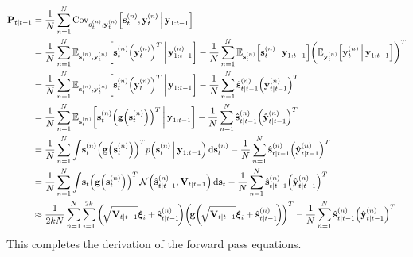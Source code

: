 		\begin{align}
			\mat{P}_{t \subgiven t - 1}
				&= \frac{1}{N} \sum_{n = 1}^{N} \Cov_{\vec{s}_t^{(n)}, \vec{y}_t^{(n)}}\!\Big[\vec{s}_t^{(n)}, \vec{y}_t^{(n)} \Biggiven \vec{y}_{1:t - 1}\Big]  \nonumber \\
				&= \frac{1}{N} \sum_{n = 1}^{N} \E_{\vec{s}_t^{(n)}, \vec{y}_t^{(n)}}\bigg[\vec{s}_t^{(n)} \Big(\vec{y}_t^{(n)}\Big)^T \bigggiven \vec{y}_{1:t - 1}^{(n)}\bigg] - \frac{1}{N} \sum_{n = 1}^{N} \E_{\vec{s}_t^{(n)}}\Big[\vec{s}_t^{(n)} \Biggiven \vec{y}_{1:t - 1}\Big] \bigg(\E_{\vec{y}_t^{(n)}}\Big[\vec{y}_t^{(n)} \Biggiven \vec{y}_{1:t - 1}\Big]\bigg)^T  \nonumber \\
				&= \frac{1}{N} \sum_{n = 1}^{N} \E_{\vec{s}_t^{(n)}, \vec{y}_t^{(n)}}\bigg[\vec{s}_t^{(n)} \Big(\vec{y}_t^{(n)}\Big)^T \bigggiven \vec{y}_{1:t - 1}\bigg] - \frac{1}{N} \sum_{n = 1}^{N} \hat{\vec{s}}_{t \subgiven t - 1}^{(n)} \Big(\hat{\vec{y}}_{t \subgiven t - 1}^{(n)}\Big)^T  \nonumber \\
				&= \frac{1}{N} \sum_{n = 1}^{N} \E_{\vec{s}_t^{(n)}}\bigg[\vec{s}_t^{(n)} \Big(\vec{g}\Big(\vec{s}_t^{(n)}\Big)\Big)^T \bigggiven \vec{y}_{1:t - 1}\bigg] - \frac{1}{N} \sum_{n = 1}^{N} \hat{\vec{s}}_{t \subgiven t - 1}^{(n)} \Big(\hat{\vec{y}}_{t \subgiven t - 1}^{(n)}\Big)^T  \nonumber \\
				&= \frac{1}{N} \sum_{n = 1}^{N} \int\! \vec{s}_t^{(n)} \Big(\vec{g}\Big(\vec{s}_t^{(n)}\Big)\Big)^T p\Big(\vec{s}_t^{(n)} \Biggiven \vec{y}_{1:t - 1}\Big) \dd{\vec{s}_t^{(n)}} - \frac{1}{N} \sum_{n = 1}^{N} \hat{\vec{s}}_{t \subgiven t - 1}^{(n)} \Big(\hat{\vec{y}}_{t \subgiven t - 1}^{(n)}\Big)^T  \nonumber \\
				&= \frac{1}{N} \sum_{n = 1}^{N} \int\! \vec{s}_t \Big(\vec{g}\Big(\vec{s}_t^{(n)}\Big)\Big)^T \,\normal\Big(\hat{\vec{s}}_{t \subgiven t - 1}^{(n)}, \mat{V}_{t \subgiven t - 1}\Big) \dd{\vec{s}_t} - \frac{1}{N} \sum_{n = 1}^{N} \hat{\vec{s}}_{t \subgiven t - 1}^{(n)} \Big(\hat{\vec{y}}_{t \subgiven t - 1}^{(n)}\Big)^T  \nonumber \\
				&\approx \frac{1}{2kN} \sum_{n = 1}^{N}  \sum_{i = 1}^{2k} \bigg(\!\sqrt{\mat{V}_{t \subgiven t - 1}} \vec{\xi}_i + \hat{\vec{s}}_{t \subgiven t - 1}^{(n)}\!\bigg) \bigg(\!\vec{g}\bigg(\!\sqrt{\mat{V}_{t \subgiven t - 1}} \vec{\xi}_i + \hat{\vec{s}}_{t \subgiven t - 1}^{(n)}\!\bigg)\!\bigg)^T - \frac{1}{N} \sum_{n = 1}^{N} \hat{\vec{s}}_{t \subgiven t - 1}^{(n)} \Big(\hat{\vec{y}}_{t \subgiven t - 1}^{(n)}\Big)^T  \label{eq:cubatureK}
		\end{align}
		This completes the derivation of the forward pass equations.

